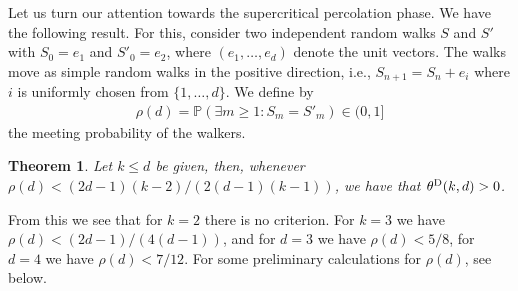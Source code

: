 \documentclass{article}
\newtheorem{theorem}{Theorem}[section]
\theoremstyle{definition}
\renewcommand{\P}{\mathbb{P}}
\newcommand{\1}{\mathbbm{1}}
\newcommand{\0}{\mathbf{o}}
\begin{document}
Let us turn our attention towards the supercritical percolation phase. We have the following result. For this, consider two independent random walks $S$ and $S'$ with $S_0=e_1$ and $S'_0=e_2$, where $(e_1,\dots, e_d)$ denote the unit vectors. The walks move as simple random walks in the positive direction, i.e., $S_{n+1}=S_n+e_i$ where $i$ is uniformly chosen from $\{1,\dots ,d\}$. We define by
\begin{align*}
\rho(d)=\P(\exists m\ge 1\colon S_m=S'_m)\in(0,1]
\end{align*}
the meeting probability of the walkers. 
\begin{theorem}
Let $k\le d$ be given, then, whenever $\rho(d)<(2d-1)(k-2)/(2(d-1)(k-1))$, we have that $\theta^{\rm D}(k,d)>0$.
\end{theorem}
From this we see that for $k=2$ there is no criterion. For $k=3$ we have $\rho(d)<(2d-1)/(4(d-1))$, and for $d=3$ we have $\rho(d)<5/8$, for $d=4$ we have $\rho(d)<7/12$. For some preliminary calculations for $\rho(d)$, see below. 
\end{document}
